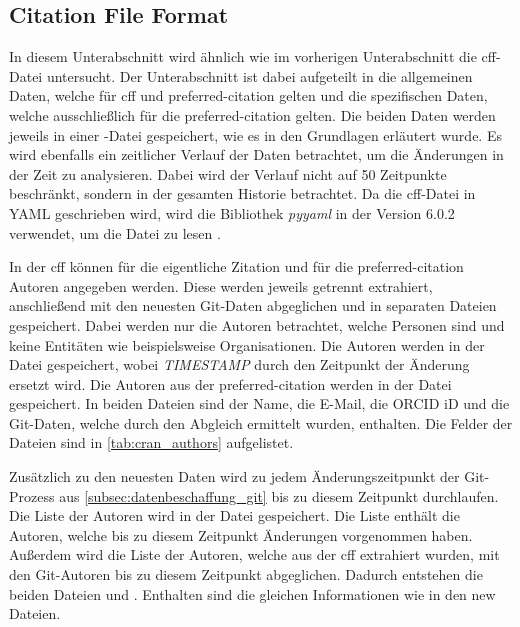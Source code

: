 \subsection{Citation File Format}
\label{subsec:datenbeschaffung_cff}
In diesem Unterabschnitt wird ähnlich wie im vorherigen Unterabschnitt die \gls{cff}-Datei untersucht.
Der Unterabschnitt ist dabei aufgeteilt in die allgemeinen Daten, welche für \gls{cff} und \grqq preferred-citation\glqq{} gelten und die spezifischen Daten, welche ausschließlich für die \grqq preferred-citation\glqq{} gelten.
Die beiden Daten werden jeweils in einer -Datei gespeichert, wie es in den Grundlagen erläutert wurde.
Es wird ebenfalls ein zeitlicher Verlauf der Daten betrachtet, um die Änderungen in der Zeit zu analysieren.
Dabei wird der Verlauf nicht auf 50 Zeitpunkte beschränkt, sondern in der gesamten Historie betrachtet.
Da die \gls{cff}-Datei in YAML geschrieben wird, wird die Bibliothek \emph{pyyaml} in der Version 6.0.2 verwendet, um die Datei zu lesen \autocite{simonov_pyyaml_2024}.

In der \gls{cff} können für die eigentliche Zitation und für die \grqq preferred-citation\glqq{} Autoren angegeben werden.
Diese werden jeweils getrennt extrahiert, anschließend mit den neuesten Git-Daten abgeglichen und in separaten Dateien gespeichert.
Dabei werden nur die Autoren betrachtet, welche Personen sind und keine Entitäten wie beispielsweise Organisationen.
Die Autoren werden in der Datei  gespeichert, wobei \emph{TIMESTAMP} durch den Zeitpunkt der Änderung ersetzt wird.
Die Autoren aus der \grqq preferred-citation\glqq{} werden in der Datei  gespeichert.
In beiden Dateien sind der Name, die E-Mail, die ORCID iD und die Git-Daten, welche durch den Abgleich ermittelt wurden, enthalten.
Die Felder der Dateien sind in \autoref{tab:cran_authors} aufgelistet.

Zusätzlich zu den neuesten Daten wird zu jedem Änderungszeitpunkt der Git-Prozess aus \autoref{subsec:datenbeschaffung_git} bis zu diesem Zeitpunkt durchlaufen.
Die Liste der Autoren wird in der Datei  gespeichert.
Die Liste enthält die Autoren, welche bis zu diesem Zeitpunkt Änderungen vorgenommen haben.
Außerdem wird die Liste der Autoren, welche aus der \gls{cff} extrahiert wurden, mit den Git-Autoren bis zu diesem Zeitpunkt abgeglichen.
Dadurch entstehen die beiden Dateien  und .
Enthalten sind die gleichen Informationen wie in den \glqq new\grqq{} Dateien.

